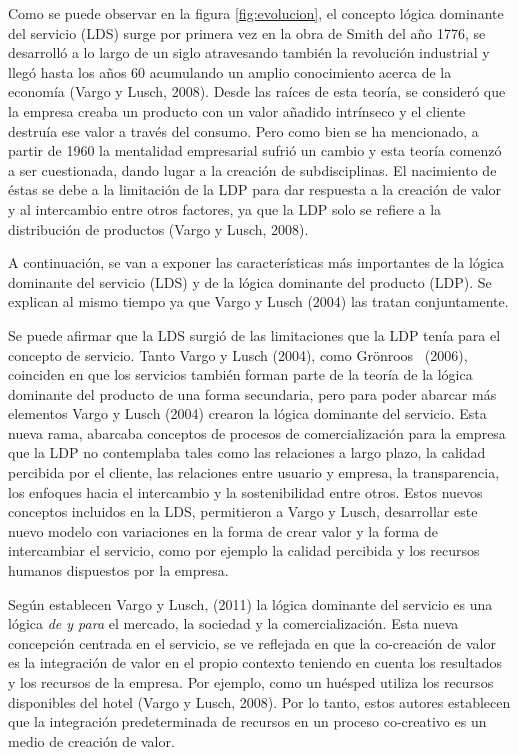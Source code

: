 Como se puede observar en la figura \ref{fig:evolucion}, el concepto lógica dominante del servicio (LDS) surge por primera vez en la obra de Smith del año 1776, se desarrolló a lo largo de un siglo atravesando también la revolución industrial y llegó hasta los años 60 acumulando un amplio conocimiento acerca de la economía (Vargo y Lusch, 2008). Desde las raíces de esta teoría, se consideró que la empresa creaba un producto con un valor añadido intrínseco y el cliente destruía ese valor a través del consumo. Pero como bien se ha mencionado, a partir de 1960 la mentalidad empresarial sufrió un cambio y esta teoría comenzó a ser cuestionada, dando lugar a la creación de subdisciplinas. El nacimiento de éstas se debe a la limitación de la LDP para dar respuesta a la creación de valor y al intercambio entre otros factores, ya que la LDP solo se refiere a la distribución de productos (Vargo y Lusch, 2008).


A continuación, se van a exponer las características más importantes de la lógica dominante del servicio (LDS) y de la lógica dominante del producto (LDP). Se explican al mismo tiempo ya que Vargo y Lusch (2004) las tratan conjuntamente.

Se puede afirmar que la LDS surgió de las limitaciones que la LDP tenía para el concepto de servicio. Tanto Vargo y Lusch (2004), como Grönroos  (2006), coinciden en que los servicios también forman parte de la teoría de la lógica dominante del producto de una forma secundaria, pero para poder abarcar más elementos Vargo y Lusch (2004) crearon la lógica dominante del servicio. Esta nueva rama, abarcaba conceptos de procesos de comercialización para la empresa que la LDP no contemplaba tales como las relaciones a largo plazo, la calidad percibida por el cliente, las relaciones entre usuario y empresa, la transparencia, los enfoques hacia el intercambio y la sostenibilidad entre otros. Estos nuevos conceptos incluidos en la LDS, permitieron a Vargo y Lusch, desarrollar este nuevo modelo con variaciones en la forma de crear valor y la forma de intercambiar el servicio, como por ejemplo la calidad percibida y los recursos humanos dispuestos por la empresa. 

Según establecen Vargo y Lusch, (2011) la lógica dominante del servicio es una lógica \emph{de y para} el mercado, la sociedad y la comercialización. Esta nueva concepción centrada en el servicio, se ve reflejada en que la co-creación de valor es la integración de valor en el propio contexto teniendo en cuenta los resultados y los recursos de la empresa. Por ejemplo, como un huésped utiliza los recursos disponibles del hotel (Vargo y Lusch, 2008). Por lo tanto, estos autores establecen que la integración predeterminada de recursos en un proceso co-creativo es un medio de creación de valor.

